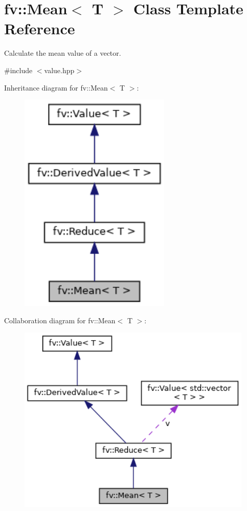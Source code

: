 \hypertarget{classfv_1_1Mean}{}\section{fv\+:\+:Mean$<$ T $>$ Class Template Reference}
\label{classfv_1_1Mean}


Calculate the mean value of a vector.  




{\ttfamily \#include $<$value.\+hpp$>$}



Inheritance diagram for fv\+:\+:Mean$<$ T $>$\+:
\nopagebreak
\begin{figure}[H]
\begin{center}
\leavevmode
\includegraphics[width=205pt]{classfv_1_1Mean__inherit__graph}
\end{center}
\end{figure}


Collaboration diagram for fv\+:\+:Mean$<$ T $>$\+:
\nopagebreak
\begin{figure}[H]
\begin{center}
\leavevmode
\includegraphics[width=350pt]{classfv_1_1Mean__coll__graph}
\end{center}
\end{figure}
